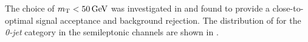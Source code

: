 The choice of $m_\text{T}< \text{50\,{GeV}}$ was investigated in \cite{Sirunyan:2017khh} and found to provide a close-to-optimal signal acceptance and background rejection.
The distribution of \mt{} for the \textit{0-jet} category  in the semileptonic channels are shown in .

